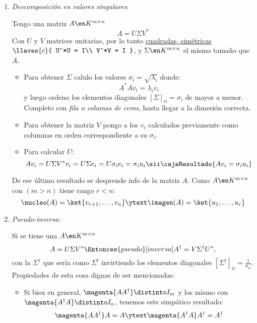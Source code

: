 \begin{enumerate}[label=\tiny\purple{\faIcon{snowman}}]
  \item \hypertarget{teoria-5:svd}{\textit{Descomposición en valores singulares}:}

        Tengo una matriz $A \en K^{m \times n}$
        $$
          A = U \Sigma V^*
        $$
        Con $U$ y $V$ matrices unitarias, por lo tanto \ul{cuadradas, simétricas}
        $\llaves{c}{
            U^*U = I\\
            V^*V = I
          }$,
        y $\Sigma \en K^{m \times n}$ el mismo tamaño que $A$.
        \begin{itemize}
          \item Para obtener $\Sigma$ calulo los valores $\sigma_i = \sqrt{\lambda_i}$ donde:
                $$
                  A^*A v_i = \lambda_i v_i
                $$
                y luego ordeno los elementos diagonales $[\Sigma]_{ii} = \sigma_i$ de mayor a menor. Completo con \textit{fila o columas de ceros},
                hasta llegar a la dimesión correcta.

          \item Para obtener la matriz $V$ pongo a los $v_i$ calculados previamente como columnas en orden correspondiente a su $\sigma_i$.

          \item Para calcular $U$:
                $$
                  Av_i = U\Sigma V^*v_i =  U\Sigma e_i = U\sigma_i e_i = \sigma_i u_i
                  \sii
                  \cajaResultado{
                    Av_i = \sigma_i u_i
                  }
                $$
        \end{itemize}
        De ese último resultado se desprende info de la matriz $A$. Como $A \en K^{m \times n}$ con $(m > n)$ tiene rango $r < n$:
        $$
          \nucleo(A) = \ket{v_{r+1}, \ldots, v_n}
          \ytext
          \imagen(A) = \ket{u_1, \ldots, u_r}
        $$

  \item \textit{Pseudo-inversa:}

        Si se tiene una $A \en K^{m \times n}$
        $$
          A = U \Sigma V^*
          \Entonces{pseudo}[inversa]
          A^\dagger = V \Sigma^\dagger U^*,
        $$
        con la $\Sigma^\dagger$ que sería como $\Sigma^t$ invirtiendo los elementos diagonales $[\Sigma^\dagger]_{ii} = \frac{1}{\sigma_{ii}}$.
        Propiedades de esta cosa dignas de ser mencionadas:
        \begin{itemize}
          \item Si bien en general, $\magenta{A A^\dagger} \distinto I_m$
                y los mismo con $\magenta{A^\dagger A} \distinto I_n$, tenemos este simpático resultado:
                $$
                  \magenta{A A^\dagger} A = A
                  \ytext
                  \magenta{A^\dagger A} A^\dagger = A^\dagger
                $$

        \end{itemize}
\end{enumerate}
